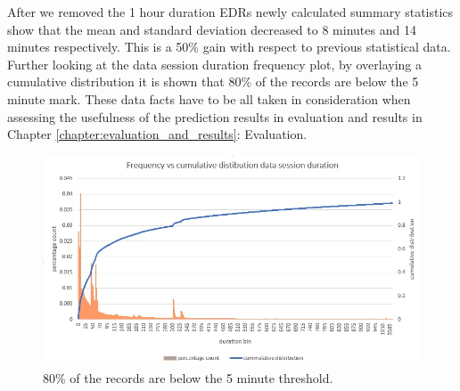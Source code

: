 \documentclass[12pt, a4paper]{report}
\theoremstyle{definition}
\theoremstyle{definition}%
\theoremstyle{definition}%
\theoremstyle{definition}%
\theoremstyle{definition}%
\theoremstyle{definition}%
\begin{document}
After we removed the 1 hour duration EDRs newly calculated summary statistics show that the mean and standard deviation decreased to 8 minutes and 14 minutes respectively. This is a 50\% gain with respect to previous statistical data. Further looking at the data session duration frequency plot, by overlaying a cumulative distribution it is shown that 80\% of the records are below the 5 minute mark. These data facts have to be all taken in consideration when assessing the usefulness of the prediction results in evaluation and results in Chapter \ref{chapter:evaluation_and_results}: Evaluation. 



\begin{table}[h]
	\label{table:summary statistics_02}
	\centering
	\caption{Basic summary statistics of main EDR dataset after removing 1 hour duration EDRs.} 
\end{table}

 
 
 \begin{figure}
 	\includegraphics[scale=0.75]{data_session_duration.jpg}
 	\centering
 	\caption[Data session duration cummultive distribution]{80\% of the records are below the 5 minute threshold.}
 	\label{fig:data_session_duration}
 \end{figure}
 
\end{document}
